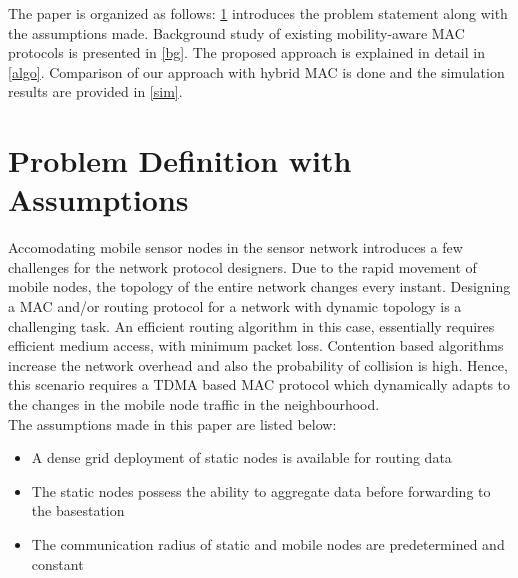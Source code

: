 \documentclass[a4paper, conference, 10pt]{IEEEtran}
\begin{document}
The paper is organized as follows: \ref{prob_def} introduces the problem statement along with the assumptions made. Background study of existing mobility-aware MAC protocols is presented in \ref{bg}. The proposed approach is explained in detail in \ref{algo}. Comparison of our approach with hybrid MAC\cite{hmac} is done and the simulation results are provided in \ref{sim}. 

\section{Problem Definition with Assumptions}
\label{prob_def}
Accomodating mobile sensor nodes in the sensor network introduces a few challenges for the network protocol designers. Due to the rapid movement of mobile nodes, the topology of the entire network changes every instant. Designing a MAC and/or routing protocol for a network with dynamic topology is a challenging task. An efficient routing algorithm in this case, essentially requires efficient medium access, with minimum packet loss. Contention based algorithms increase the network overhead and also the probability of collision is high. Hence, this scenario requires a TDMA based MAC protocol which dynamically adapts to the changes in the mobile node traffic in the neighbourhood.  \\%

The assumptions made in this paper are listed below:
\begin{itemize}
	\item A dense grid deployment of static nodes is available for routing data
	\item The static nodes possess the ability to aggregate data before forwarding to the basestation
	\item The communication radius of static and mobile nodes are predetermined and constant
\end{itemize}

\end{document}

